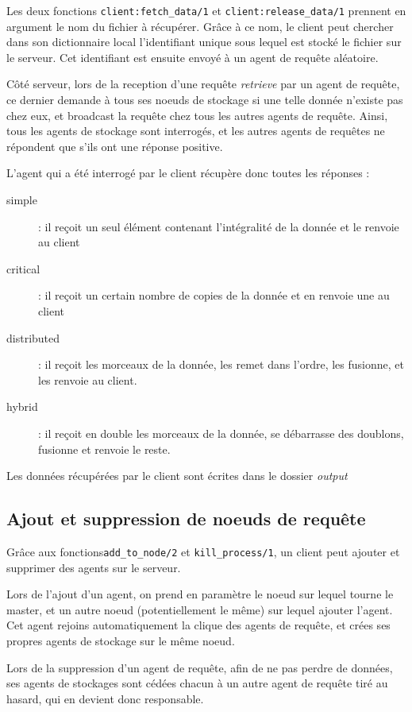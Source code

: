 \documentclass[a4paper]{article}
\begin{document}
Les deux fonctions \texttt{client:fetch\_data/1} et \texttt{client:release\_data/1} prennent en argument le nom du fichier à récupérer.
Grâce à ce nom, le client peut chercher dans son dictionnaire local l'identifiant unique sous lequel est stocké le fichier sur le serveur.
Cet identifiant est ensuite envoyé à un agent de requête aléatoire.

Côté serveur, lors de la reception d'une requête \emph{retrieve} par un agent de requête, ce dernier demande à tous ses noeuds de stockage si une telle donnée n'existe pas chez eux, et
broadcast la requête chez tous les autres agents de requête. Ainsi, tous les agents de stockage sont interrogés, et les autres agents de requêtes ne répondent que s'ils ont une réponse
positive.

L'agent qui a été interrogé par le client récupère donc toutes les réponses :
\begin{description}
    \item[simple] : il reçoit un seul élément contenant l'intégralité de la donnée et le renvoie au client
    \item[critical] : il reçoit un certain nombre de copies de la donnée et en renvoie une au client
    \item[distributed] : il reçoit les morceaux de la donnée, les remet dans l'ordre, les fusionne, et les renvoie au client.
    \item[hybrid] : il reçoit en double les morceaux de la donnée, se débarrasse des doublons, fusionne et renvoie le reste.
\end{description}

Les données récupérées par le client sont écrites dans le dossier \emph{output}

\subsection{Ajout et suppression de noeuds de requête}
\label{ssec:kill_add}
Grâce aux fonctions\texttt{add\_to\_node/2} et \texttt{kill\_process/1}, un client peut ajouter
et supprimer des agents sur le serveur.

Lors de l'ajout d'un agent, on prend en paramètre le noeud sur lequel tourne le master, et un autre noeud (potentiellement le même) sur
lequel ajouter l'agent. Cet agent rejoins automatiquement la clique des agents de requête, et crées ses propres agents de stockage sur le même noeud.

Lors de la suppression d'un agent de requête, afin de ne pas perdre de données, ses agents de stockages sont cédées chacun à un autre agent de requête tiré au hasard, qui en devient donc responsable.
\end{document}
